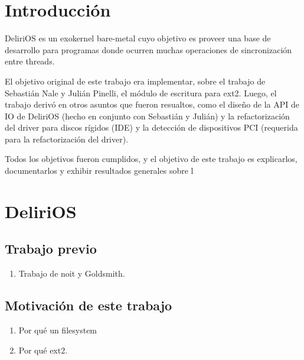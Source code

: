 \section{Introducción}
DeliriOS es un exokernel bare-metal cuyo objetivo es proveer una base de desarrollo para programas donde ocurren muchas operaciones de sincronización entre threads.

El objetivo original de este trabajo era implementar, sobre el trabajo de Sebastián Nale y Julián Pinelli, el módulo de escritura para ext2.
Luego, el trabajo derivó en otros asuntos que fueron resualtos, como el diseño de la API de IO de DeliriOS (hecho en conjunto con Sebastián y Julián) y la refactorización del driver para discos rígidos (IDE) y la detección de dispositivos PCI (requerida para la refactorización del driver).

Todos los objetivos fueron cumplidos, y el objetivo de este trabajo es explicarlos, documentarlos y exhibir resultados generales sobre l
\newpage

\section{DeliriOS}

\subsection{Trabajo previo}
\begin{enumerate}
  \item Trabajo de noit y Goldsmith.
\end{enumerate}

\subsection{Motivación de este trabajo}

\begin{enumerate}
  \item Por qué un filesystem
  \item Por qué ext2.
\end{enumerate}

